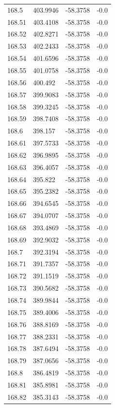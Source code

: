 \begin{table}[H]
\begin{tabular}{llll}
168.5 & 403.9946 & -58.3758 & -0.0 \\
168.51 & 403.4108 & -58.3758 & -0.0 \\
168.52 & 402.8271 & -58.3758 & -0.0 \\
168.53 & 402.2433 & -58.3758 & -0.0 \\
168.54 & 401.6596 & -58.3758 & -0.0 \\
168.55 & 401.0758 & -58.3758 & -0.0 \\
168.56 & 400.492 & -58.3758 & -0.0 \\
168.57 & 399.9083 & -58.3758 & -0.0 \\
168.58 & 399.3245 & -58.3758 & -0.0 \\
168.59 & 398.7408 & -58.3758 & -0.0 \\
168.6 & 398.157 & -58.3758 & -0.0 \\
168.61 & 397.5733 & -58.3758 & -0.0 \\
168.62 & 396.9895 & -58.3758 & -0.0 \\
168.63 & 396.4057 & -58.3758 & -0.0 \\
168.64 & 395.822 & -58.3758 & -0.0 \\
168.65 & 395.2382 & -58.3758 & -0.0 \\
168.66 & 394.6545 & -58.3758 & -0.0 \\
168.67 & 394.0707 & -58.3758 & -0.0 \\
168.68 & 393.4869 & -58.3758 & -0.0 \\
168.69 & 392.9032 & -58.3758 & -0.0 \\
168.7 & 392.3194 & -58.3758 & -0.0 \\
168.71 & 391.7357 & -58.3758 & -0.0 \\
168.72 & 391.1519 & -58.3758 & -0.0 \\
168.73 & 390.5682 & -58.3758 & -0.0 \\
168.74 & 389.9844 & -58.3758 & -0.0 \\
168.75 & 389.4006 & -58.3758 & -0.0 \\
168.76 & 388.8169 & -58.3758 & -0.0 \\
168.77 & 388.2331 & -58.3758 & -0.0 \\
168.78 & 387.6494 & -58.3758 & -0.0 \\
168.79 & 387.0656 & -58.3758 & -0.0 \\
168.8 & 386.4819 & -58.3758 & -0.0 \\
168.81 & 385.8981 & -58.3758 & -0.0 \\
168.82 & 385.3143 & -58.3758 & -0.0 \\

\end{tabular}
\end{table}
